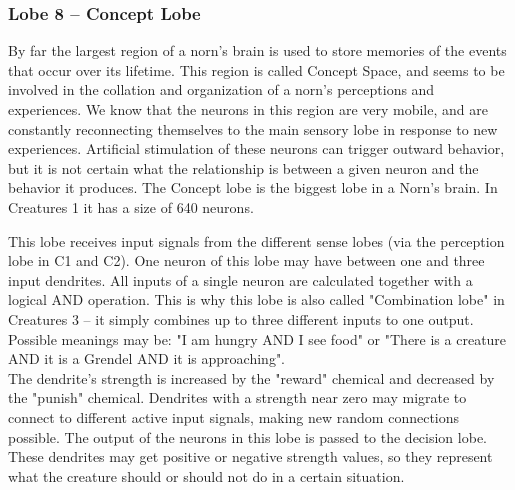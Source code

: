 \documentclass[11pt,twoside,a4paper]{article}
\begin{document}


\subsubsection{Lobe 8 -- Concept Lobe}


By far the largest region of a norn's brain is used to store memories of the events that occur over its lifetime. This region is called Concept Space, and seems to be involved in the collation and organization of a norn's perceptions and experiences. We know that the neurons in this region are very mobile, and are constantly reconnecting themselves to the main sensory lobe in response to new experiences. Artificial stimulation of these neurons can trigger outward behavior, but it is not certain what the relationship is between a given neuron and the behavior it produces. The Concept lobe is the biggest lobe in a Norn's brain. In Creatures 1 it has a size of 640 neurons.~\\

\clearpage

This lobe receives input signals from the different sense lobes (via the perception lobe in C1 and C2). One neuron of this lobe may have between one and three input dendrites. All inputs of a single neuron are calculated together with a logical AND operation. This is why this lobe is also called "Combination lobe" in Creatures 3 -- it simply combines up to three different inputs to one output. Possible meanings may be: "I am hungry AND I see food" or "There is a creature AND it is a Grendel AND it is approaching".~\\

The dendrite's strength is increased by the "reward" chemical and decreased by the "punish" chemical. Dendrites with a strength near zero may migrate to connect to different active input signals, making new random connections possible. The output of the neurons in this lobe is passed to the decision lobe. These dendrites may get positive or negative strength values, so they represent what the creature should or should not do in a certain situation.~\\
\end{document}
